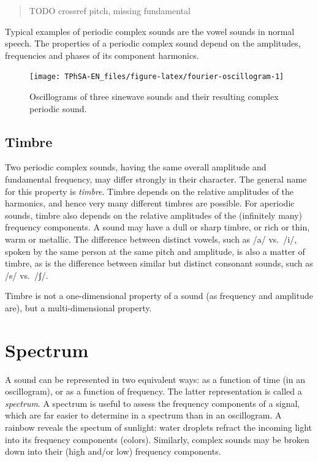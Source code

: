 \documentclass[
]{book}
\begin{document}
\begin{quote}
TODO crossref pitch, missing fundamental
\end{quote}

Typical examples of periodic complex sounds are the vowel sounds in normal speech. The properties of a periodic complex sound depend on the amplitudes, frequencies and phases of its component harmonics.

\begin{figure}

{\centering \texttt{[image: TPhSA-EN\_files/figure-latex/fourier-oscillogram-1]} 

}

\caption{Oscillograms of three sinewave sounds and their resulting complex periodic sound.}\label{fig:fourier-oscillogram}
\end{figure}

\subsection{Timbre}\label{timbre}

Two periodic complex sounds, having the same overall amplitude and fundamental frequency, may differ strongly in their character.
The general name for this property is \emph{timbre}.
Timbre depends on the relative amplitudes of the harmonics, and hence very many different timbres are possible.
For aperiodic sounds, timbre also depends on the relative amplitudes of the (infinitely many) frequency components.
A sound may have a dull or sharp timbre, or rich or thin, warm or metallic. The difference between distinct vowels, such as /a/ vs.~/i/, spoken by the same person at the same pitch and amplitude, is also a matter of timbre, as is the difference between similar but distinct consonant sounds, such as /s/ vs.~/ʃ/.

Timbre is not a one-dimensional property of a sound (as frequency and amplitude are), but a multi-dimensional property.

\section{Spectrum}\label{sec:spectrum}

A sound can be represented in two equivalent ways: as a function of time (in an oscillogram), or as a function of frequency. The latter representation is called a \emph{spectrum}. A spectrum is useful to assess the frequency components of a signal, which are far easier to determine in a spectrum than in an oscillogram. A rainbow reveals the spectum of sunlight: water droplets refract the incoming light into its frequency components (colors). Similarly, complex sounds may be broken down into their (high and/or low) frequency components.
\end{document}
